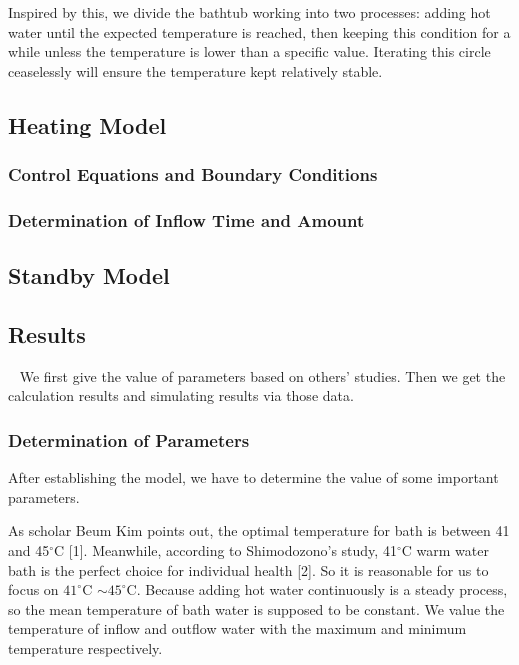 \documentclass{mcmthesis}
\begin{document}
Inspired by this, we divide the bathtub working into two processes: adding
hot water until the expected temperature is reached, then keeping this
condition for a while unless the temperature is lower than a specific value. Iterating this circle ceaselessly will ensure the temperature kept relatively stable.

\subsection{Heating Model}

\subsubsection{Control Equations and Boundary Conditions}

\subsubsection{Determination of Inflow Time and Amount}

\subsection{Standby Model}

\subsection{Results}

\quad~ We first give the value of parameters based on others’ studies. Then we get the calculation results and simulating results via those data.

\subsubsection{Determination of Parameters}

After establishing the model, we have to determine the value of some
important parameters.

As scholar Beum Kim points out, the optimal temperature for bath is
between 41 and 45$^\circ$C [1]. Meanwhile, according to Shimodozono's study, 41$^\circ$C warm water bath is the perfect choice for individual health [2]. So it is reasonable for us to focus on $41^\circ$C $\sim 45^\circ$C. Because adding hot water continuously is a steady process, so the mean temperature of bath water is supposed to be constant. We value the temperature of inflow and outflow water with the maximum and minimum temperature respectively.
\end{document}
